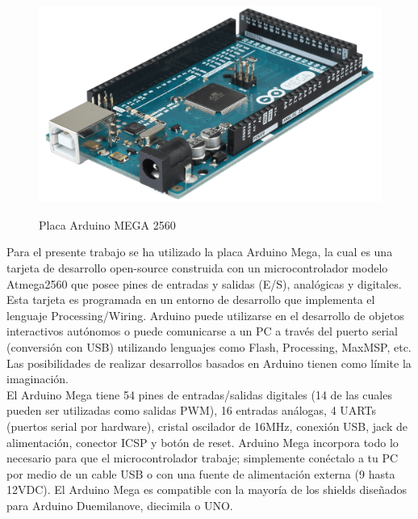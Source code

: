 \begin{figure}[H]
  \begin{center}
    \includegraphics[scale=0.07]{imagenes/arduino_mega.png}\\
    \caption{Placa Arduino MEGA 2560}
  \end{center}
\end{figure}


Para el presente trabajo se ha utilizado la placa Arduino Mega, la cual es una tarjeta de desarrollo open-source construida con un microcontrolador modelo Atmega2560 que posee 
pines de entradas y salidas (E/S), analógicas y digitales. Esta tarjeta es programada en un entorno de desarrollo que implementa el lenguaje Processing/Wiring. Arduino puede
utilizarse en el desarrollo de objetos interactivos autónomos o puede comunicarse a un PC a través del puerto serial (conversión con USB) utilizando lenguajes como Flash,
Processing, MaxMSP, etc. Las posibilidades de realizar desarrollos basados en Arduino tienen como límite la imaginación.\\

El Arduino Mega tiene 54 pines de entradas/salidas digitales (14 de las cuales pueden ser utilizadas como salidas PWM), 16 entradas análogas, 4 UARTs (puertos serial por
hardware), cristal oscilador de 16MHz, conexión USB, jack de alimentación, conector ICSP y botón de reset.  Arduino Mega incorpora todo lo necesario para que el microcontrolador
trabaje; simplemente conéctalo a tu PC por medio de un cable USB o con una fuente de alimentación externa (9 hasta 12VDC). El Arduino Mega es compatible con la mayoría de los 
shields diseñados para Arduino Duemilanove, diecimila o UNO.

